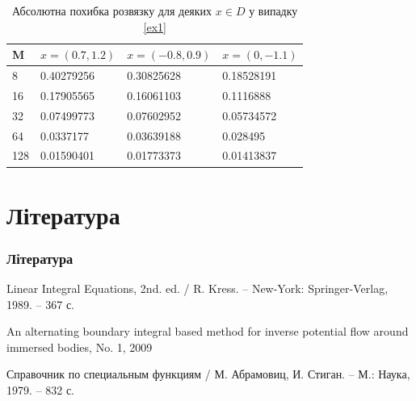 \documentclass{beamer}
\numberwithin{equation}{section}
\begin{document}
	\begin{frame}
	
	\begin{table}
		\begin{tabular}{l l l l}
			\toprule
			\textbf{M} & $x = (0.7, 1.2)$ & $x = (-0.8, 0.9)$  & $x = (0, -1.1)$  \\
			\midrule
			8 & 0.40279256 & 0.30825628& 0.18528191 \\			
			16 & 0.17905565 & 0.16061103 & 0.1116888 \\
			32 & 0.07499773&  0.07602952 & 0.05734572 \\
			64 & 0.0337177 & 0.03639188 & 0.028495 \\
			128 & 0.01590401 & 0.01773373 & 0.01413837 \\
			\bottomrule
		\end{tabular}
		\caption{Абсолютна похибка розвязку для деяких $x \in D$ у випадку \ref{ex1} }
	\end{table}
\end{frame}

	
	
\section*{Література}
\begin{frame}
	\thispagestyle{empty}
	\frametitle{Література}
	\begin{thebibliography}{99}
		

		Linear Integral Equations, 2nd. ed. / R. Kress. -- 
		New-York: Springer-Verlag, 1989. -- 367 с.
		
		An alternating boundary integral based method for inverse potential flow around immersed bodies, No. 1, 2009

		Справочник по специальным функциям / М. Абрамовиц, И. Стиган. 
		-- М.: Наука, 1979. -- 832 с.

	\end{thebibliography}
\end{frame}

	

	
\end{document}
